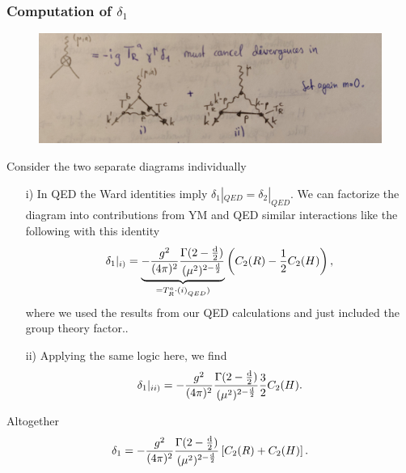 \subsubsection{Computation of $\delta_1$}
\begin{figure}[h!]
	\centering
	\includegraphics[width=0.7\linewidth]{gfx/YMpictures/YMoneLoopDeltaOne}
	\caption{}
	\label{fig:ymoneloopdeltaone}
\end{figure}
Consider the two separate diagrams individually
\begin{enumerate}
	\item[i)] In QED the Ward identities imply $\delta_1 |_{QED} = \delta_2|_{QED}$. We can factorize the diagram into contributions from YM and QED similar interactions like the following with this identity
	\begin{equation}
		\delta_1 |_{i)} = \underbrace{- \frac{g^2}{(4 \pi)^2} \frac{\Gamma(2-\frac{\mathrm{d}}{2})}{(\mu^2)^{2-\frac{\mathrm{d}}{2}} }}_{= T^a_R \cdot ({i)}_{QED})} \left(C_2(R)-\frac{1}{2} C_2(H)\right),
	\end{equation}
	where we used the results from our QED calculations and just included the group theory factor..
	\item[ii)] Applying the same logic here, we find
	\begin{equation}
		\delta_1 |_{ii)} = -\frac{g^2}{(4 \pi)^2} \frac{\Gamma(2-\frac{\mathrm{d}}{2})}{(\mu^2)^{2-\frac{\mathrm{d}}{2}} } \frac{3}{2} C_2(H).
	\end{equation}
\end{enumerate}
Altogether
 \begin{equation}
 	\delta_1 = - \frac{g^2}{(4 \pi)^2} \frac{\Gamma(2-\frac{\mathrm{d}}{2})}{(\mu^2)^{2-\frac{\mathrm{d}}{2}}} \left[C_2(R)+C_2(H)\right].
 \end{equation}
 
